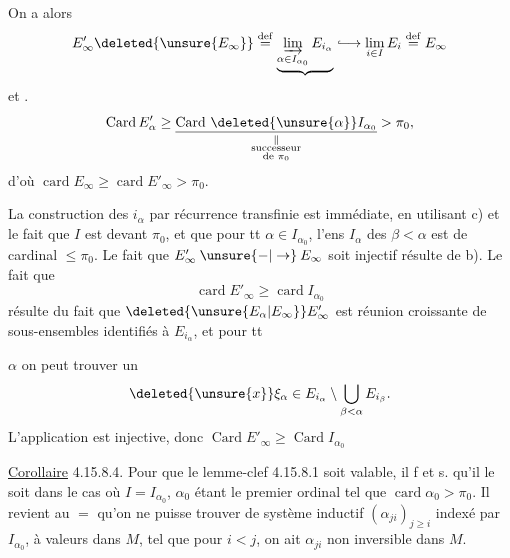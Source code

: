 On a alors
\[
E'_\infty\deleted{\unsure{E_\infty}}\overset{\mathrm{def}}{=}\underbrace{\underset{\alpha\in I_{\alpha_0}}{\varinjlim}\,E_{i_\alpha}}\lhook\joinrel\longrightarrow
\underset{i\in I}{\lim}\,E_i\overset{\mathrm{def}}{=}E_\infty
\]
et .
\[
\operatorname{Card} E'_\alpha\geq\underset{\substack{\Vert\\\text{successeur}\\\text{de }\pi_0}}{\underline{\operatorname{Card}\,\deleted{\unsure{\alpha}}I_{\alpha_0}}}>\pi_0,
\]
d'où $\operatorname{card} E_\infty\geq\operatorname{card} E'_\infty>\pi_0$.

 La construction des $i_\alpha$ par récurrence transfinie est immédiate, en utilisant c) et le fait que $I$ est  devant $\pi_0$, et que pour tt $\alpha\in I_{\alpha_0}$, l'ens
$I_\alpha$ des  $\beta<\alpha$ est de cardinal $\leq\pi_0$. Le fait que $E'_\infty\mathbin{\unsure{-|\to}}E_\infty$ soit injectif résulte de b). Le fait que 
\[
\operatorname{card} E'_\infty\geq\operatorname{card} I_{\alpha_0}
\]
résulte du fait que $\deleted{\unsure{E_\alpha|E_\infty}}E'_\infty$ est réunion croissante de sous-ensembles identifiés à $E_{i_\alpha}$, et pour tt

$\alpha$  on peut trouver un
\[
\deleted{\unsure{x}}\xi_\alpha\in E_{i_\alpha}\setminus\bigcup_{\beta<\alpha}E_{i_\beta}.
\]
L'application
est injective, donc $\operatorname{Card} E'_\infty\geq\operatorname{Card} I_{\alpha_0}$

\uline{Corollaire} 4.15.8.4. Pour  que le lemme-clef 4.15.8.1 soit valable, il f et s.
\noindent\makebox[0pt][r]{\smash{\rule[-10\baselineskip]{0.4pt}{10\baselineskip}}\quad}qu'il le soit  dans le cas où $I=I_{\alpha_0}$, $\alpha_0$ étant le premier ordinal tel que $\operatorname{card}\alpha_0>\pi_0$.
Il revient au $=$ qu'on ne puisse trouver de système inductif $(\alpha_{ji})_{j\geq i}$ indexé par $I_{\alpha_0}$, à valeurs dans $M$, tel que pour  $i<j$, on ait $\alpha_{ji}$ non inversible dans $M$.

